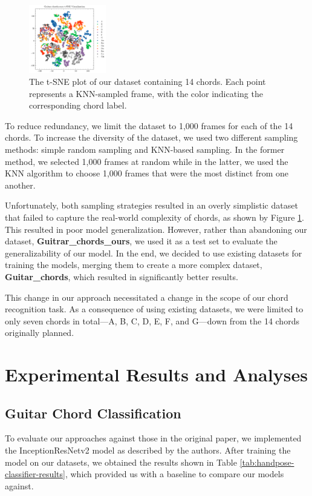 \documentclass[10pt,twocolumn,letterpaper]{article}
\begin{document}
\begin{figure}[h]
  \centering
  \includegraphics[width=0.3\textwidth]{images/final/Guitar-chords-ours_tsne_plot.png}
  \caption{The t-SNE plot of our dataset containing 14 chords. Each point represents a KNN-sampled frame, with the color indicating the corresponding chord label.}
  \label{fig:ours-tsne-plot}
\end{figure}

To reduce redundancy, we limit the dataset to 1,000 frames for each of the 14 chords. To increase the diversity of the dataset, we used two different sampling methods: simple random sampling and KNN-based sampling. In the former method, we selected 1,000 frames at random while in the latter, we used the KNN algorithm to choose 1,000 frames that were the most distinct from one another.

Unfortunately, both sampling strategies resulted in an overly simplistic dataset that failed to capture the real-world complexity of chords, as shown by Figure \ref{fig:ours-tsne-plot}. This resulted in poor model generalization. However, rather than abandoning our dataset, \textbf{Guitrar\_chords\_ours}, we used it as a test set to evaluate the generalizability of our model. In the end, we decided to use existing datasets \cite{guitar-chord-tvon8_dataset,guitar-chord-bounding-box_dataset, guitar-chord-handshape_dataset, guitar-chords-daewp_dataset} for training the models, merging them to create a more complex dataset, \textbf{Guitar\_chords}, which resulted in significantly better results.

This change in our approach necessitated a change in the scope of our chord recognition task. As a consequence of using existing datasets, we were limited to only seven chords in total—A, B, C, D, E, F, and G—down from the 14 chords originally planned.

\section{Experimental Results and Analyses}
\label{sec:results}

\subsection{Guitar Chord Classification}
To evaluate our approaches against those in the original paper, we implemented the InceptionResNetv2 model as described by the authors. After training the model on our datasets, we obtained the results shown in Table \ref{tab:handpose-classifier-results}, which provided us with a baseline to compare our models against.
\end{document}
